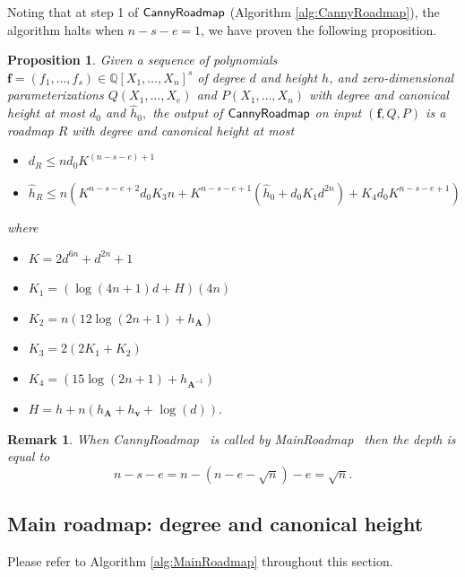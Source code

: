 \documentclass[12pt]{article}
\def\mA{{\bm A}}
\newtheorem{prop}[theorem]{Proposition}
\newtheorem{remark}[theorem]{Remark}
\def\CannyRoadmapL{{\sf CannyRoadmap}}
\def\MainRoadmap{{\sf MainRoadmap}}
\def\CannyRoadmap{{\sf CannyRoadmap}}
\def\mA{{\bm A}}
\begin{document}
Noting that at step 1 of  $\CannyRoadmap$ (Algorithm \ref{alg:CannyRoadmap}), the algorithm halts when $n-s-e=1$, we have proven the following proposition. 
\begin{prop}\label{prop:CannyComplexity}
    Given a sequence of polynomials $\bm f = (f_1,\hdots,f_s) \in \mathbb{Q}[X_1,\hdots,X_n]^s$ of degree $d$ and height $h$, and zero-dimensional parameterizations $Q(X_1,\hdots,X_e)$  and $P(X_1,\hdots,X_n)$ with degree and canonical height at most $d_0$ and $\hat{h}_0,$ the output of $\CannyRoadmapL$ on input $(\bm f, Q, P)$ is a roadmap $R$ with degree and canonical height at most
    \begin{itemize}
        \item $d_{R} \leq nd_0K^{(n-s-e)+1}$
        \item $\hat{h}_R \leq n(K^{n-s-e+2}d_0K_3n + K^{n-s-e+1}(\hat{h}_0+d_0K_1d^{2n})+K_4d_0K^{n-s-e+1})$
    \end{itemize} 
    where 
    \begin{itemize}
    \item $K = 2d^{6n} + d^{2n} + 1$
    \item $K_1 = (\log(4n+1)d+H)(4n)$
    \item $K_2 = n(12\log(2n+1)+h_{\mA})$
    \item $K_3 = 2(2K_1+K_2)$
    \item $K_4 = (15\log(2n+1)+h_{\mA^{-1}})$
    \item $H = h + n(h_{\bm A} + h_{\bm v} + \log(d)).$
\end{itemize}
\end{prop}



\begin{remark}
When \CannyRoadmap~ is called by \MainRoadmap~ then the depth is equal to
    \[
    n-s-e=n-(n-e-\sqrt{n})-e = \sqrt{n}.
    \]
\end{remark}











\subsection{Main roadmap: degree and canonical height}
Please refer to Algorithm \ref{alg:MainRoadmap} throughout this section. 
\end{document}
